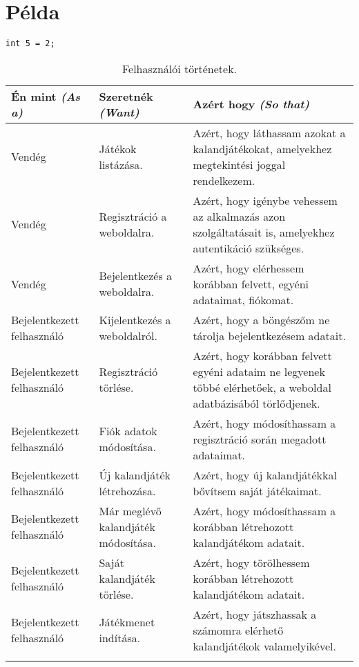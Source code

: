 \chapter{Példa} %
\label{ch:impl}


\begin{lstlisting}
int 5 = 2;
\end{lstlisting}
\begin{center}
	\begin{longtable}{ | m{} | 	m{} |m{}| }
		\hline
		\textbf{Én mint \newline \textit{(As a)}} & \textbf{Szeretnék \newline \textit{(Want)}} & \textbf{Azért hogy \newline \textit{(So that)}} \\
		\hline \hline
		
		Vendég & Játékok listázása. & Azért, hogy láthassam azokat a kalandjátékokat, amelyekhez megtekintési joggal rendelkezem. \\
		\hline
		
		Vendég & Regisztráció a weboldalra. & Azért, hogy igénybe vehessem az alkalmazás azon szolgáltatásait is, amelyekhez autentikáció szükséges. \\
		\hline
		
		Vendég &  Bejelentkezés a weboldalra. & Azért, hogy elérhessem korábban felvett, egyéni adataimat, fiókomat.\\
		\hline
		
		Bejelentkezett felhasználó & Kijelentkezés a weboldalról. & Azért, hogy a böngészőm ne tárolja bejelentkezésem adatait.\\
		\hline
		
		Bejelentkezett felhasználó & Regisztráció törlése.& Azért, hogy korábban felvett egyéni adataim ne legyenek többé elérhetőek, a weboldal adatbázisából törlődjenek.\\
		\hline
		
		Bejelentkezett felhasználó & Fiók adatok módosítása. & Azért, hogy módosíthassam a regisztráció során megadott adataimat.\\
		\hline
		
		Bejelentkezett felhasználó & Új kalandjáték létrehozása. & Azért, hogy új kalandjátékkal bővítsem saját játékaimat.\\
		\hline
		
		Bejelentkezett felhasználó & Már meglévő kalandjáték módosítása. & Azért, hogy módosíthassam a korábban létrehozott kalandjátékom adatait.\\
		\hline
		
		Bejelentkezett felhasználó & Saját kalandjáték törlése. & Azért, hogy törölhessem korábban létrehozott kalandjátékom adatait. \\
		\hline
		
		Bejelentkezett felhasználó & Játékmenet indítása. & Azért, hogy játszhassak a számomra elérhető kalandjátékok valamelyikével.\\
		\hline
		
	\caption{Felhasználói történetek.}
	\label{user_storys}
	\end{longtable}
\end{center}


